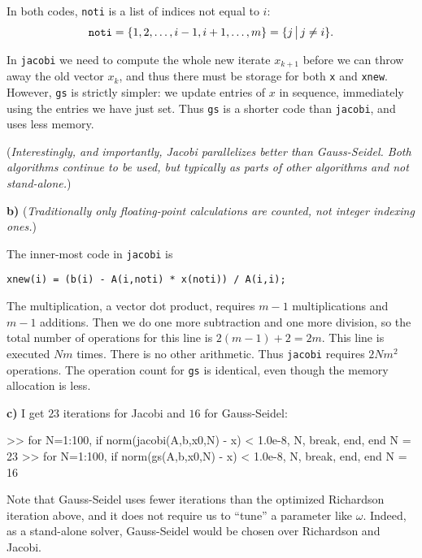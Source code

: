 \documentclass[11pt]{amsart}
\newcommand{\mfile}[2]{
\bigskip
\begin{quote}
\medskip
\VerbatimInput[frame=single,framesep=3mm,label=\fbox{\normalsize \textsl{\,#1\,}},fontfamily=courier,fontsize=\scriptsize]{#2}
\medskip
\end{quote}
}
\newcommand{\epart}[1]{\medskip\noindent\textbf{#1)}}
\begin{document}


In both codes, \texttt{noti} is a list of indices not equal to $i$:
    $$\text{\texttt{noti}} = \{1,2,\dots,i-1,i+1,\dots,m\} = \{j\,\big|\,j\neq i\}.$$

In \texttt{jacobi} we need to compute the whole new iterate $x_{k+1}$ before we can throw away the old vector $x_k$, and thus there must be storage for both \texttt{x} and \texttt{xnew}.  However, \texttt{gs} is strictly simpler: we update entries of $x$ in sequence, immediately using the entries we have just set.  Thus \texttt{gs} is a shorter code than \texttt{jacobi}, and uses less memory.

(\emph{Interestingly, and importantly, Jacobi \emph{parallelizes} better than Gauss-Seidel.  Both algorithms continue to be used, but typically as parts of other algorithms and not stand-alone.})


\epart{b}  (\emph{Traditionally only floating-point calculations are counted, not integer indexing ones.})

The inner-most code in \texttt{jacobi} is

\begin{center}
\verb|xnew(i) = (b(i) - A(i,noti) * x(noti)) / A(i,i);|
\end{center}

\noindent The multiplication, a vector dot product, requires $m-1$ multiplications and $m-1$ additions.  Then we do one more subtraction and one more division, so the total number of operations for this line is $2(m-1)+2 = 2m$.  This line is executed $Nm$ times.  There is no other arithmetic.  Thus \texttt{jacobi} requires $2Nm^2$ operations.  The operation count for \texttt{gs} is identical, even though the memory allocation is less.

\epart{c}  I get $23$ iterations for Jacobi and $16$ for Gauss-Seidel:
\begin{mVerb}
>> for N=1:100, if norm(jacobi(A,b,x0,N) - x) < 1.0e-8, N, break, end, end
N =                   23
>> for N=1:100, if norm(gs(A,b,x0,N) - x) < 1.0e-8, N, break, end, end
N =                   16
\end{mVerb}

Note that Gauss-Seidel uses fewer iterations than the optimized Richardson iteration above, and it does not require us to ``tune'' a parameter like $\omega$.  Indeed, as a stand-alone solver, Gauss-Seidel would be chosen over Richardson and Jacobi.
\end{document}
